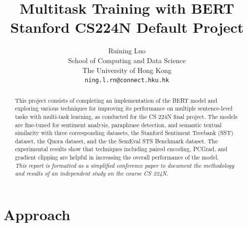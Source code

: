 \documentclass{article}
\title{
  Multitask Training with BERT \\
  \vspace{1em}
  \small{\normalfont Stanford CS224N Default Project} 
}
\author{
  Ruining Luo \\
  School of Computing and Data Science \\
  The University of Hong Kong\\
  \texttt{ning.l.rn@connect.hku.hk} \\
}
\begin{document}
\maketitle

\begin{abstract}
  This project consists of completing an implementation of the BERT model and exploring various techniques
  for improving its performance on multiple sentence-level tasks with multi-task learning,
  as conducted for the CS 224N final project. 
  The models are fine-tuned for sentiment analysis, paraphrase detection, and semantic textual similarity with three corresponding datasets,
  the Stanford Sentiment Treebank (SST) dataset, the Quora dataset, and the the SemEval STS Benchmark dataset.
  The experimental results show that techniques including paired encoding, PCGrad, and gradient clipping are helpful in increasing the overall performance of the model.\\
  \textit{This report is formatted as a simplified conference paper to document the methodology and results of an independent study on the course CS 224N.}
\end{abstract}


\section{Approach}
\end{document}
